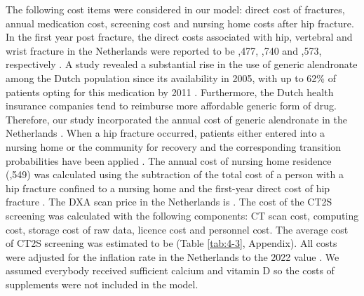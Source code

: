 The following cost items were considered in our model: direct cost of fractures, annual medication cost, screening cost and nursing home costs after hip fracture. In the first year post fracture, the direct costs associated with hip, vertebral and wrist fracture in the Netherlands were reported to be ,477, ,740 and ,573, respectively \cite{4-63,4-64,4-65}. A study revealed a substantial rise in the use of generic alendronate among the Dutch population since its availability in 2005, with up to 62\% of patients opting for this medication by 2011 \cite{4-66}. Furthermore, the Dutch health insurance companies tend to reimburse more affordable generic form of drug. Therefore, our study incorporated the annual cost of generic alendronate in the Netherlands \cite{4-67}. When a hip fracture occurred, patients either entered into a nursing home or the community for recovery and the corresponding transition probabilities have been applied \cite{4-68,4-69}. The annual cost of nursing home residence (,549) was calculated using the subtraction of the total cost of a person with a hip fracture confined to a nursing home and the first-year direct cost of hip fracture \cite{4-70}. The DXA scan price in the Netherlands is  \cite{4-64}. The cost of the CT2S screening was calculated with the following components: CT scan cost, computing cost, storage cost of raw data, licence cost and personnel cost. The average cost of CT2S screening was estimated to be  (Table \ref{tab:4-3}, Appendix). All costs were adjusted for the inflation rate in the Netherlands to the 2022 value \cite{4-71}. We assumed everybody received sufficient calcium and vitamin D so the costs of supplements were not included in the model.


